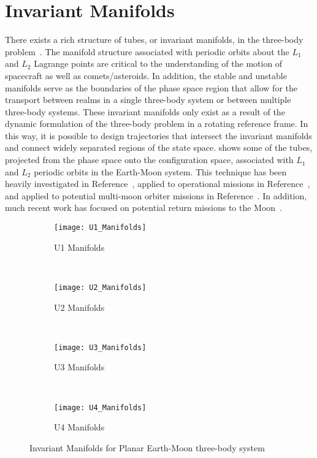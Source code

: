 \documentclass[letterpaper, paper,11pt]{AAS}		%
\begin{document}
\section{Invariant Manifolds} \label{sec:invariant_manifold}
There exists a rich structure of tubes, or invariant manifolds, in the three-body problem~\cite{koon2000,conley1968}.
The manifold structure associated with periodic orbits about the \( L_1 \) and \( L_2 \) Lagrange points are critical to the understanding of the motion of spacecraft as well as comets/asteroids.
In addition, the stable and unstable manifolds serve as the boundaries of the phase space region that allow for the transport between realms in a single three-body system or between multiple three-body systems.
These invariant manifolds only exist as a result of the dynamic formulation of the three-body problem in a rotating reference frame. 
In this way, it is possible to design trajectories that intersect the invariant manifolds and connect widely separated regions of the state space. 
 shows some of the tubes, projected from the phase space onto the configuration space, associated with \( L_1 \) and \( L_2 \) periodic orbits in the Earth-Moon system. 
This technique has been heavily investigated in Reference~, applied to operational missions in Reference~, and applied to potential multi-moon orbiter missions in Reference~.
In addition, much recent work has focused on potential return missions to the Moon~\cite{zanzottera2012,campagnola2012,mingotti2011,ozimek2010a,mingotti2009}.
\begin{figure}
     \centering
        \begin{subfigure}[b]{0.25\textwidth}
                \texttt{[image: U1\_Manifolds]}
                \caption{U1 Manifolds}
                \label{fig:u1_manifolds}
        \end{subfigure}%
        ~%
        \begin{subfigure}[b]{0.25\textwidth}
                \texttt{[image: U2\_Manifolds]}
                \caption{U2 Manifolds}
                \label{fig:u2_manifolds}
        \end{subfigure}~
        \begin{subfigure}[b]{0.25\textwidth}
                \texttt{[image: U3\_Manifolds]}
                \caption{U3 Manifolds}
                \label{fig:u3_manifolds}
        \end{subfigure}%
        ~%
        \begin{subfigure}[b]{0.25\textwidth}
                \texttt{[image: U4\_Manifolds]}
                \caption{U4 Manifolds}
                \label{fig:u4_manifolds}
        \end{subfigure}
        \caption{Invariant Manifolds for Planar Earth-Moon three-body system}
	\label{fig:invariant_manifolds}
\end{figure}
\end{document}
